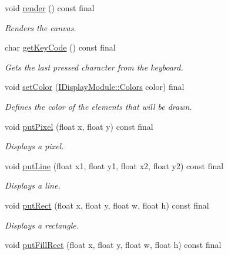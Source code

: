 \begin{DoxyCompactItemize}
void \mbox{\hyperlink{classArcade_1_1Display_1_1SFML_a23af1507649a0a5492241646ef0fbaac}{render}} () const final
\begin{DoxyCompactList}\small\item\em Renders the canvas. \end{DoxyCompactList}\item 
char \mbox{\hyperlink{classArcade_1_1Display_1_1SFML_ae2bf9e9c157a9f0ae8d1b60bd072e881}{get\+Key\+Code}} () const final
\begin{DoxyCompactList}\small\item\em Gets the last pressed character from the keyboard. \end{DoxyCompactList}\item 
void \mbox{\hyperlink{classArcade_1_1Display_1_1SFML_aee515eb3ff41dc4f23a0115d2bc4f4a7}{set\+Color}} (\mbox{\hyperlink{classArcade_1_1Display_1_1IDisplayModule_ae0a776be9163d096051c522e21c007b2}{I\+Display\+Module\+::\+Colors}} color) final
\begin{DoxyCompactList}\small\item\em Defines the color of the elements that will be drawn. \end{DoxyCompactList}\item 
void \mbox{\hyperlink{classArcade_1_1Display_1_1SFML_a68417ef6b0450c6c7e6fa022699a2c3b}{put\+Pixel}} (float x, float y) const final
\begin{DoxyCompactList}\small\item\em Displays a pixel. \end{DoxyCompactList}\item 
void \mbox{\hyperlink{classArcade_1_1Display_1_1SFML_a7e6da03013c96af1362b584282d9ba01}{put\+Line}} (float x1, float y1, float x2, float y2) const final
\begin{DoxyCompactList}\small\item\em Displays a line. \end{DoxyCompactList}\item 
void \mbox{\hyperlink{classArcade_1_1Display_1_1SFML_a177bbd0afd21be8a66bc970b8007e7cd}{put\+Rect}} (float x, float y, float w, float h) const final
\begin{DoxyCompactList}\small\item\em Displays a rectangle. \end{DoxyCompactList}\item 
void \mbox{\hyperlink{classArcade_1_1Display_1_1SFML_acb25e2345face39175b447a06b8b8dc1}{put\+Fill\+Rect}} (float x, float y, float w, float h) const final

\end{DoxyCompactItemize}
